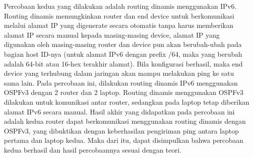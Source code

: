 Percobaan kedua yang dilakukan adalah routing dinamis menggunakan IPv6. Routing dinamis memungkinkan router dan end device untuk berkomunikasi melalui alamat IP yang digenerate secara otomatis tanpa harus memberikan alamat IP secara manual kepada masing-masing device, alamat IP yang digunakan oleh masing-masing router dan device pun akan berubah-ubah pada bagian host ID-nya (untuk alamat IPv6 dengan prefix /64, maka yang berubah adalah 64-bit atau 16-hex terakhir alamat). Bila konfigurasi berhasil, maka end device yang terhubung dalam jaringan akan mampu melakukan ping ke satu sama lain. Pada percobaan ini, dilakukan routing dinamis IPv6 menggunakan OSPFv3 dengan 2 router dan 2 laptop. Routing dinamis menggunakan OSPFv3 dilakukan untuk komunikasi antar router, sedangkan pada laptop tetap diberikan alamat IPv6 secara manual. Hasil akhir yang didapatkan pada percobaan ini adalah kedua router dapat berkomunikasi menggunakan routing dinamis dengan OSPFv3, yang dibuktikan dengan keberhasilan pengiriman ping antara laptop pertama dan laptop kedua. Maka dari itu, dapat disimpulkan bahwa percobaan kedua berhasil dan hasil percobaannya sesuai dengan teori.
